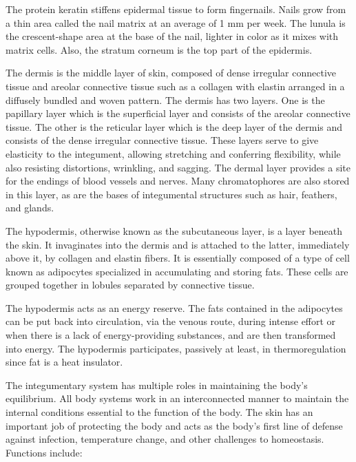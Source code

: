 The protein keratin stiffens epidermal tissue to form fingernails. Nails grow from a thin area called the nail matrix at an average of 1 mm per week. The lunula is the crescent-shape area at the base of the nail, lighter in color as it mixes with matrix cells. Also, the stratum corneum is the top part of the epidermis.

The dermis is the middle layer of skin, composed of dense irregular connective tissue and areolar connective tissue such as a collagen with elastin arranged in a diffusely bundled and woven pattern. The dermis has two layers. One is the papillary layer which is the superficial layer and consists of the areolar connective tissue. The other is the reticular layer which is the deep layer of the dermis and consists of the dense irregular connective tissue. These layers serve to give elasticity to the integument, allowing stretching and conferring flexibility, while also resisting distortions, wrinkling, and sagging. The dermal layer provides a site for the endings of blood vessels and nerves. Many chromatophores are also stored in this layer, as are the bases of integumental structures such as hair, feathers, and glands.

The hypodermis, otherwise known as the subcutaneous layer, is a layer beneath the skin. It invaginates into the dermis and is attached to the latter, immediately above it, by collagen and elastin fibers. It is essentially composed of a type of cell known as adipocytes specialized in accumulating and storing fats. These cells are grouped together in lobules separated by connective tissue.

The hypodermis acts as an energy reserve. The fats contained in the adipocytes can be put back into circulation, via the venous route, during intense effort or when there is a lack of energy-providing substances, and are then transformed into energy. The hypodermis participates, passively at least, in thermoregulation since fat is a heat insulator.

The integumentary system has multiple roles in maintaining the body's equilibrium. All body systems work in an interconnected manner to maintain the internal conditions essential to the function of the body. The skin has an important job of protecting the body and acts as the body's first line of defense against infection, temperature change, and other challenges to homeostasis. Functions include:

